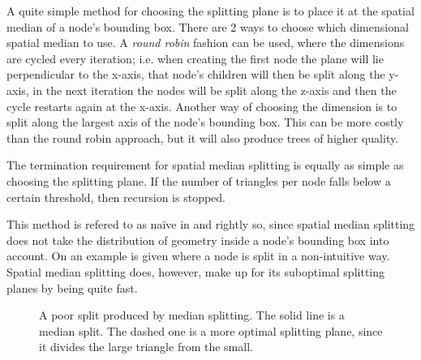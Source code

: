 

A quite simple method for choosing the splitting plane is to place it
at the spatial median of a node's bounding box. There are 2 ways to
choose which dimensional spatial median to use. A \textit{round robin}
fashion can be used, where the dimensions are cycled every iteration;
i.e. when creating the first node the plane will lie perpendicular to
the x-axis, that node's children will then be split along the y-axis,
in the next iteration the nodes will be split along the z-axis and
then the cycle restarts again at the x-axis. Another way of choosing
the dimension is to split along the largest axis of the node's
bounding box. This can be more costly than the round robin approach,
but it will also produce trees of higher quality.

The termination requirement for spatial median splitting is equally as
simple as choosing the splitting plane. If the number of triangles per
node falls below a certain threshold, then recursion is stopped.


This method is refered to as naïve in  and
rightly so, since spatial median splitting does not take the
distribution of geometry inside a node's bounding box into account. On
 an example is given where a node is split in a
non-intuitive way. Spatial median splitting does, however, make up for
its suboptimal splitting planes by being quite fast.


\begin{figure}
  \centering

  \vspace{3mm}
  \parbox{5cm}{\caption[A poor split produced by median splitting.]{A
      poor split produced by median splitting. The solid line is a
      median split. The dashed one is a more optimal splitting plane,
      since it divides the large triangle from the
      small.}\label{fig:crapMedian}}
\end{figure}

